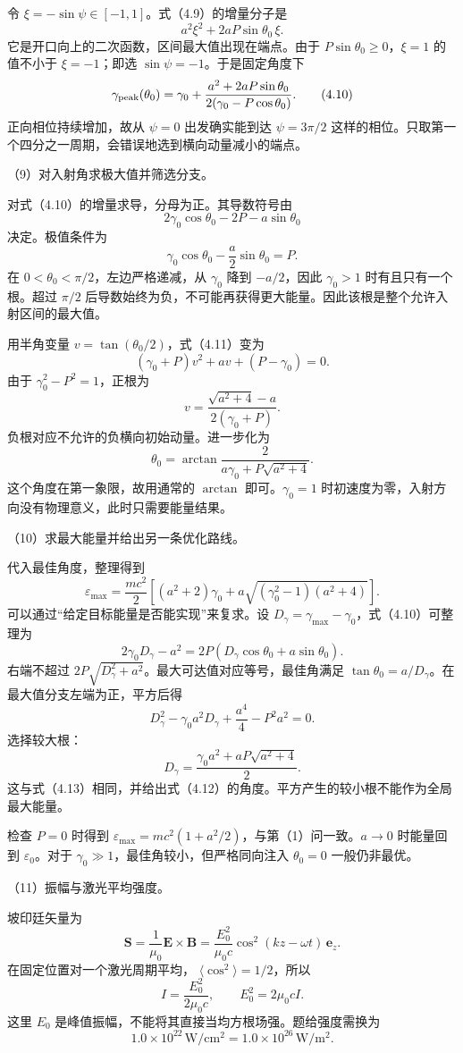 \documentclass[12pt,a4paper,fontset=fandol]{ctexart}
\begin{document}
令 \(\xi=-\sin\psi\in[-1,1]\)。式（4.9）的增量分子是 \[
a^2\xi^2+2aP\sin\theta_0\,\xi.
\] 它是开口向上的二次函数，区间最大值出现在端点。由于
\(P\sin\theta_0\ge0\)，\(\xi=1\) 的值不小于 \(\xi=-1\)；即选
\(\sin\psi=-1\)。于是固定角度下 \[
\gamma_{\rm peak}(\theta_0)
=\gamma_0+\frac{a^2+2aP\sin\theta_0}
{2(\gamma_0-P\cos\theta_0)}.\tag{4.10}
\] 正向相位持续增加，故从 \(\psi=0\) 出发确实能到达 \(\psi=3\pi/2\)
这样的相位。只取第一个四分之一周期，会错误地选到横向动量减小的端点。

（9）对入射角求极大值并筛选分支。

对式（4.10）的增量求导，分母为正。其导数符号由 \[
2\gamma_0\cos\theta_0-2P-a\sin\theta_0
\] 决定。极值条件为 \[
\boxed{\gamma_0\cos\theta_0-\frac a2\sin\theta_0=P.}\tag{4.11}
\] 在 \(0<\theta_0<\pi/2\)，左边严格递减，从 \(\gamma_0\) 降到
\(-a/2\)，因此 \(\gamma_0>1\) 时有且只有一个根。超过 \(\pi/2\)
后导数始终为负，不可能再获得更大能量。因此该根是整个允许入射区间的最大值。

用半角变量 \(v=\tan(\theta_0/2)\)，式（4.11）变为 \[
(\gamma_0+P)v^2+av+(P-\gamma_0)=0.
\] 由于 \(\gamma_0^2-P^2=1\)，正根为 \[
v=\frac{\sqrt{a^2+4}-a}{2(\gamma_0+P)}.
\] 负根对应不允许的负横向初始动量。进一步化为 \[
\boxed{\theta_0=
\arctan\frac{2}{a\gamma_0+P\sqrt{a^2+4}}.}\tag{4.12}
\] 这个角度在第一象限，故用通常的 \(\arctan\) 即可。\(\gamma_0=1\)
时初速度为零，入射方向没有物理意义，此时只需要能量结果。

（10）求最大能量并给出另一条优化路线。

代入最佳角度，整理得到 \[
\boxed{
\varepsilon_{\max}=
\frac{mc^2}{2}
\left[(a^2+2)\gamma_0
+a\sqrt{(\gamma_0^2-1)(a^2+4)}\right].}\tag{4.13}
\] 可以通过``给定目标能量是否能实现''来复求。设
\(D_\gamma=\gamma_{\max}-\gamma_0\)，式（4.10）可整理为 \[
2\gamma_0D_\gamma-a^2
=2P(D_\gamma\cos\theta_0+a\sin\theta_0).
\] 右端不超过
\(2P\sqrt{D_\gamma^2+a^2}\)。最大可达值对应等号，最佳角满足
\(\tan\theta_0=a/D_\gamma\)。在最大值分支左端为正，平方后得 \[
D_\gamma^2-\gamma_0a^2D_\gamma
+\frac{a^4}{4}-P^2a^2=0.
\] 选择较大根： \[
D_\gamma=\frac{\gamma_0a^2+aP\sqrt{a^2+4}}2.
\]
这与式（4.13）相同，并给出式（4.12）的角度。平方产生的较小根不能作为全局最大能量。

检查 \(P=0\) 时得到
\(\varepsilon_{\max}=mc^2(1+a^2/2)\)，与第（1）问一致。\(a\to0\)
时能量回到 \(\varepsilon_0\)。对于
\(\gamma_0\gg1\)，最佳角较小，但严格同向注入 \(\theta_0=0\)
一般仍非最优。

（11）振幅与激光平均强度。

坡印廷矢量为 \[
\mathbf S=\frac1{\mu_0}\mathbf E\times\mathbf B
=\frac{E_0^2}{\mu_0c}\cos^2(kz-\omega t)\,\mathbf e_z.
\] 在固定位置对一个激光周期平均， \(\langle\cos^2\rangle=1/2\)，所以 \[
\boxed{I=\frac{E_0^2}{2\mu_0c},\qquad
E_0^2=2\mu_0cI.}\tag{4.14}
\] 这里 \(E_0\) 是峰值振幅，不能将其直接当均方根场强。题给强度需换为 \[
1.0\times10^{22}\,\mathrm{W/cm^2}
=1.0\times10^{26}\,\mathrm{W/m^2}.
\]
\end{document}
